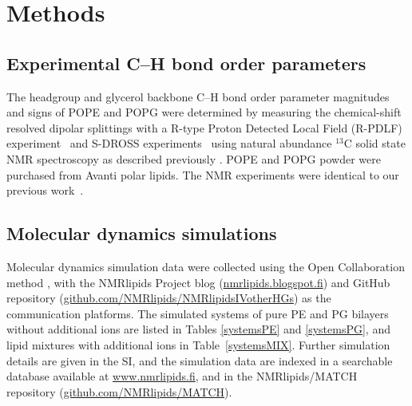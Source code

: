 \documentclass[aps,prl,superscriptaddress,twocolumn]{revtex4}
\begin{document}



\section{Methods}
\subsection{Experimental C--H bond order parameters}
The headgroup and glycerol backbone C--H bond order parameter magnitudes and signs of POPE and POPG
were determined by measuring the chemical-shift resolved dipolar splittings
with a R-type Proton Detected Local Field (R-PDLF) experiment~\cite{dvinskikh04} and
S-DROSS experiments~\cite{gross97} using natural abundance $^{13}$C solid state NMR spectroscopy
as described previously \cite{ferreira13,ferreira16}.
POPE and POPG powder were purchased from Avanti polar lipids.
The NMR experiments were identical to our previous work~\cite{antila19}.

\subsection{Molecular dynamics simulations}

Molecular dynamics simulation data were collected using
the Open Collaboration method \cite{botan15}, with
the NMR\-lipids Project blog (\url{nmrlipids.blogspot.fi}) and
GitHub repository (\url{github.com/NMRlipids/NMRlipidsIVotherHGs})
as the communication platforms.
The simulated systems of pure PE and PG bilayers without additional ions
are listed in Tables \ref{systemsPE} and \ref{systemsPG},
and lipid mixtures with additional ions in Table~\ref{systemsMIX}.
Further simulation details are given in the SI, and
the simulation data are indexed in a
searchable database available at \url{www.nmrlipids.fi},
and in the NMRlipids/MATCH repository (\url{github.com/NMRlipids/MATCH}).
\end{document}
